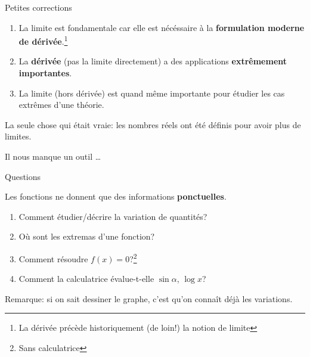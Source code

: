 \documentclass{beamer}
\begin{document}
\begin{frame}
    {Petites corrections}

    \begin{enumerate}
        \item La limite est fondamentale car elle est nécéssaire
            à la \textbf{formulation moderne de dérivée}.\footnote{La dérivée précède historiquement (de loin!) la notion de limite}
            \pause{}
        \item La \textbf{dérivée} (pas la limite directement) a des applications
            \textbf{extrêmement importantes}.
            \pause{}
        \item La limite (hors dérivée) est quand même importante pour étudier les cas extrêmes d'une théorie.
            \pause{}
    \end{enumerate}

    La seule chose qui était vraie:
    les nombres réels ont été définis pour avoir plus de limites.
\end{frame}

\begin{frame}
    {Il nous manque un outil \dots}

    \begin{exampleblock}
        {Questions}

        Les fonctions ne donnent que des informations \textbf{ponctuelles}.

        \begin{enumerate}
            \item Comment étudier/décrire la variation de quantités?
                \pause{}
            \item Où sont les extremas d'une fonction?
                \pause{}
            \item Comment résoudre $f(x) = 0$?\footnote{Sans calculatrice}
                \pause{}
            \item Comment la calculatrice évalue-t-elle $\sin \alpha$, $\log x$?
        \end{enumerate}
    \end{exampleblock}

    Remarque: si on sait dessiner le graphe, c'est qu'on connaît déjà les variations.
\end{frame}
\end{document}

